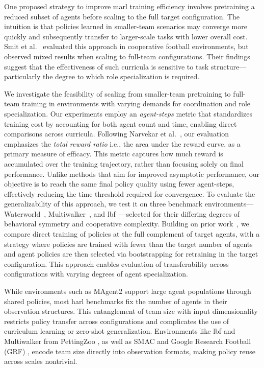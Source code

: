 \documentclass{article}
\begin{document}
One proposed strategy to improve \gls{marl} training efficiency involves pretraining 
a reduced subset of agents before scaling to the full target configuration. 
The intuition is that policies learned in smaller-team scenarios may converge 
more quickly and subsequently transfer to larger-scale tasks with lower overall cost. 
Smit et al.~\cite{smit2023} evaluated this approach in cooperative football environments, 
but observed mixed results when scaling to full-team configurations. Their findings 
suggest that the effectiveness of such curricula is sensitive to task structure—particularly 
the degree to which role specialization is required.

We investigate the feasibility of scaling from smaller-team pretraining to full-team 
training in environments with varying demands for coordination and role specialization.
Our experiments employ an \emph{agent-steps} metric that standardizes training cost by 
accounting for both agent count and time, enabling direct comparisons across curricula. 
Following Narvekar et al.~\cite{narvekar2020}, our evaluation emphasizes the 
\textit{total reward ratio} i.e., the area under the reward curve, as a primary 
measure of efficacy. This metric captures how much reward is accumulated 
over the training trajectory, rather than focusing solely on final performance. 
Unlike methods that aim for improved asymptotic performance, 
our objective is to reach the same final policy quality using fewer agent-steps, 
effectively reducing the time threshold required for convergence.
To evaluate the generalizability of this approach, we test it on three benchmark 
environments—Waterworld~\cite{gupta2017}, Multiwalker~\cite{gupta2017}, 
and \gls{lbf}~\cite{papoudakis2021}—selected for their 
differing degrees of behavioral symmetry and cooperative complexity. 
Building on prior work~\cite{smit2023}, we compare 
direct training of policies at the full complement of target agents, with a strategy 
where policies are trained with fewer than the target number of agents and agent 
policies are then selected via bootstrapping for retraining in the target configuration.
This approach enables evaluation of transferability across configurations with 
varying degrees of agent specialization.

While environments such as MAgent2 \cite{zheng2017} support large agent populations through 
shared policies, most \gls{harl} benchmarks fix the number of agents in their observation structures. 
This entanglement of team size with input dimensionality restricts policy transfer across 
configurations and complicates the use of curriculum learning or zero-shot generalization. 
Environments like \gls{lbf} and Multiwalker from PettingZoo \cite{terry2021}, as well as 
SMAC \cite{samvelyan2019} and Google Research Football (GRF) \cite{kurach2020}, 
encode team size directly into observation formats, making policy reuse across scales nontrivial.
\end{document}
